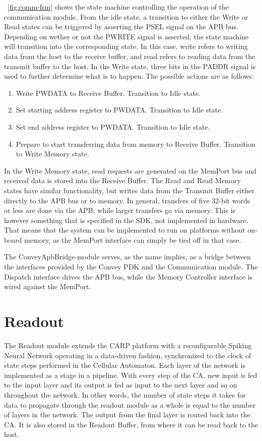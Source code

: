 \figurename~\ref{fig:comm-fsm} shows the state machine controlling the operation
of the communication module. From the idle state, a transition to either the
Write or Read states can be triggered by asserting the PSEL signal on the APB
bus. Depending on wether or not the PWRITE signal is asserted, the state machine
will transition into the corresponding state. In this case, write refers to
writing data from the host to the receive buffer, and read refers to reading
data from the transmit buffer to the host. In the Write state, three bits in the
PADDR signal is used to further determine what is to happen. The possible
actions are as follows:

\begin{enumerate}
\item Write PWDATA to Receive Buffer. Transition to Idle state.
\item Set starting address register to PWDATA. Transition to Idle state.
\item Set end address register to PWDATA. Transition to Idle state.
\item Prepare to start transferring data from memory to Receive Buffer.
  Transition to Write Memory state.
\end{enumerate}

In the Write Memory state, read requests are generated on the MemPort bus and
received data is stored into the Receive Buffer. The Read and Read Memory states
have similar functionality, but writes data from the Transmit Buffer either
directly to the APB bus or to memory. In general, transfers of five 32-bit words
or less are done via the APB, while larger transfers go via memory. This is
however something that is specified in the SDK, not implemented in hardware.
That means that the system can be implemented to run on platforms without
on-board memory, as the MemPort interface can simply be tied off in that case.

The ConveyApbBridge-module serves, as the name implies, as a bridge between the
interfaces provided by the Convey PDK and the Communication module. The Dispatch
interface drives the APB bus, while the Memory Controller interface is wired
against the MemPort.

\clearpage

\section{Readout}
\label{sec:readout}

The Readout module extends the CARP platform with a reconfigurable Spiking
Neural Network operating in a data-driven fashion, synchronized to the clock of
state steps performed in the Cellular Automaton. Each layer of the network is
implemented as a stage in a pipeline. With every step of the CA, new input is
fed to the input layer and its output is fed as input to the next layer and so
on throughout the network. In other words, the number of state steps it takes
for data to propagate through the readout module as a whole is equal to the
number of layers in the network. The output from the final layer is routed back
into the CA. It is also stored in the Readout Buffer, from where it can be read
back to the host.

